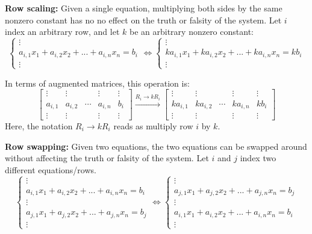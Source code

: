 \documentclass{article}
\begin{document}
\vspace{5mm}

{\bf Row scaling:} Given a single equation, multiplying both sides by the same nonzero constant has no no effect on the truth or falsity of the system. Let \(i\) index an arbitrary row, and let \(k\) be an arbitrary nonzero constant:
\[\left\{\begin{array}{c}
\vdots \\   
a_{i,1} x_1 + a_{i,2} x_2 + ... + a_{i,n} x_n = b_i \\   
\vdots 
\end{array}\right. 
\iff 
\left\{\begin{array}{c}
\vdots \\   
k a_{i,1} x_1 + k a_{i,2} x_2 + ... + k a_{i,n} x_n = k b_i \\   
\vdots 
\end{array}\right.\]

In terms of augmented matrices, this operation is:
\[\left[\begin{array}{cccc|c}
\vdots & \vdots &  & \vdots & \vdots \\   
a_{i,1} & a_{i,2} & \cdots & a_{i,n} & b_i \\   
\vdots & \vdots &  & \vdots & \vdots 
\end{array}\right] 
\xrightarrow{R_i \rightarrow kR_i} 
\left[\begin{array}{cccc|c}
\vdots & \vdots &  & \vdots & \vdots \\   
k a_{i,1} & k a_{i,2} & \cdots & k a_{i,n} & k b_i \\   
\vdots & \vdots &  & \vdots & \vdots 
\end{array}\right]\]
Here, the notation \(R_i \rightarrow kR_i\) reads as multiply row \(i\) by \(k\).

\vspace{5mm}

{\bf Row swapping:} Given two equations, the two equations can be swapped around without affecting the truth or falsity of the system. Let \(i\) and \(j\) index two different equations/rows.
\[\left\{\begin{array}{c}
\vdots \\   
a_{i,1} x_1 + a_{i,2} x_2 + ... + a_{i,n} x_n = b_i \\   
\vdots \\ 
a_{j,1} x_1 + a_{j,2} x_2 + ... + a_{j,n} x_n = b_j \\
\vdots 
\end{array}\right. 
\iff 
\left\{\begin{array}{c}
\vdots \\   
a_{j,1} x_1 + a_{j,2} x_2 + ... + a_{j,n} x_n = b_j \\   
\vdots \\ 
a_{i,1} x_1 + a_{i,2} x_2 + ... + a_{i,n} x_n = b_i \\
\vdots 
\end{array}\right.\]
\end{document}
